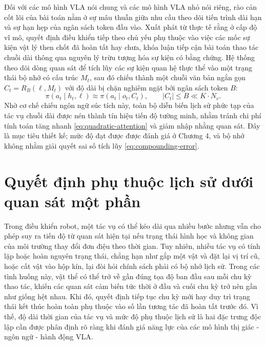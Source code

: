 Đối với các mô hình VLA nói chung và các mô hình VLA nhỏ nói riêng, rào cản cốt lõi của bài toán nằm ở sự mâu thuẫn giữa nhu cầu theo dõi tiến trình dài hạn và sự hạn hẹp của ngân sách token đầu vào. Xuất phát từ thực tế rằng ở cấp độ vĩ mô, quyết định điều khiển tiếp theo chủ yếu phụ thuộc vào việc các mốc sự kiện vật lý then chốt đã hoàn tất hay chưa, khóa luận tiếp cận bài toán thao tác chuỗi dài thông qua nguyên lý trừu tượng hóa sự kiện có bằng chứng. Hệ thống theo dõi dòng quan sát để tích lũy các sự kiện quan hệ thực thể vào một trạng thái bộ nhớ có cấu trúc $M_t$, sau đó chiếu thành một chuỗi văn bản ngắn gọn $C_t = R_B(\ell, M_t)$ với độ dài bị chặn nghiêm ngặt bởi ngân sách token $B$:
\begin{equation}
\pi(a_t \mid h_t, \ell) \approx \pi(a_t \mid o_t, C_t), \qquad |C_t| \le B \ll K \cdot N_v.
\label{eq:event-projection-policy}
\end{equation}
Nhờ cơ chế chiếu ngôn ngữ súc tích này, toàn bộ diễn biến lịch sử phức tạp của tác vụ chuỗi dài được nén thành tín hiệu tiến độ tường minh, nhằm tránh chi phí tính toán tăng nhanh \eqref{eq:quadratic-attention} và giảm nhập nhằng quan sát. Đây là mục tiêu thiết kế; mức độ đạt được được đánh giá ở Chương 4, và bộ nhớ không nhằm giải quyết sai số tích lũy \eqref{eq:compounding-error}.

\section{Quyết định phụ thuộc lịch sử dưới quan sát một phần}
\label{sec:pomdp}

Trong điều khiển robot, một tác vụ có thể kéo dài qua nhiều bước nhưng vẫn cho phép suy ra tiến độ từ quan sát hiện tại nếu trạng thái hình học và không gian của môi trường thay đổi đơn điệu theo thời gian. Tuy nhiên, nhiều tác vụ có tính lặp hoặc hoàn nguyên trạng thái, chẳng hạn như gắp một vật và đặt lại vị trí cũ, hoặc cất vật vào hộp kín, lại đòi hỏi chính sách phải có bộ nhớ lịch sử. Trong các tình huống này, vật thể có thể trở về gần đúng tọa độ ban đầu sau mỗi chu kỳ thao tác, khiến các quan sát cảm biến tức thời ở đầu và cuối chu kỳ trở nên gần như giống hệt nhau. Khi đó, quyết định tiếp tục chu kỳ mới hay duy trì trạng thái kết thúc hoàn toàn phụ thuộc vào số lần tương tác đã hoàn tất trước đó. Vì thế, độ dài thời gian của tác vụ và mức độ phụ thuộc lịch sử là hai đặc trưng độc lập cần được phân định rõ ràng khi đánh giá năng lực của các mô hình thị giác - ngôn ngữ - hành động VLA.

